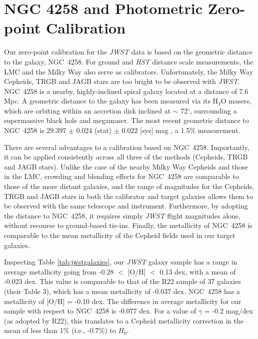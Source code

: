 \documentclass[12pt,modern]{aastex631}
\newcommand{\ho}{$H_{0}$\xspace}
\newcommand{\hst}{\emph{HST}\xspace}
\newcommand{\jwst}{\emph{JWST}\xspace}
\newcommand{\ngc}{NGC\,\xspace}
\begin{document}
\section{NGC 4258 and Photometric Zero-point Calibration}
\label{sec:anchor}

Our zero-point calibration for the \jwst data is based on the geometric distance to the galaxy, \ngc 4258. For ground and \hst distance scale measurements, the LMC  and the Milky Way also serve as calibrators. Unfortunately, the Milky Way Cepheids, TRGB and JAGB stars are too bright to be observed with \jwst.  \ngc 4258 is a nearby,  highly-inclined  spiral galaxy
located at a distance of 7.6 Mpc. A geometric distance to the galaxy  has been measured via its H$_2$O masers, which are orbiting within an  accretion disk inclined at $\sim$ 72$^\circ$,  surrounding a supermassive black hole \citep[see][]{humphreys_2013, reid_2019} and megamaser. The most recent geometric distance to \ngc 4258 is 29.397 $\pm$ 0.024 (stat) $\pm$ 0.022 [sys] mag \citep{reid_2019}, a 1.5\% measurement. 


There are several advantages to a calibration  based on \ngc 4258. Importantly, it can be applied consistently across all three of the methods (Cepheids, TRGB and JAGB stars).  Unlike the case of the nearby Milky Way Cepheids and those in the LMC, crowding and blending effects for \ngc 4258 are comparable to those of the more distant galaxies, and the range of magnitudes  for the  Cepheids, TRGB and JAGB stars in both the calibrator and target galaxies allows them to be observed with the same telescope and instrument. Furthermore, by adopting the distance to \ngc 4258, it requires simply \jwst flight magnitudes alone, without recourse to ground-based tie-ins.  Finally, the metallicity of \ngc 4258 is comparable to the mean metallicity of the Cepheid fields used in our target galaxies. 

Inspecting Table \ref{tab:jwstgalaxies}, our \jwst galaxy sample has a range in average  metallicity going from -0.28 $<$ [O/H] $<$ 0.13 dex, with a mean of -0.023 dex. This value is comparable to that of the R22 sample of 37 galaxies (their Table 3), which has a mean metallicity of -0.037 dex. \ngc 4258 has a metallicity of [O/H] = -0.10 dex. The difference in average metallicity for our sample with respect to  \ngc 4258 is -0.077 dex. For a value of $\gamma$ = -0.2 mag/dex (as adopted by R22), this translates to a Cepheid metallicity correction in the mean of less than  1\% (i.e., -0.7\%) to \ho.
\end{document}
